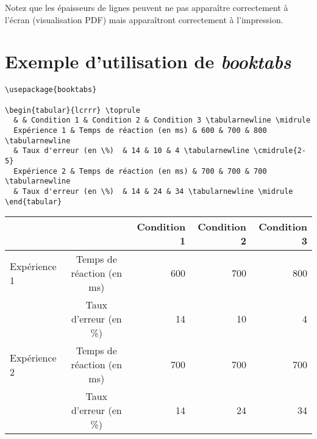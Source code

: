 Notez que les épaisseurs de lignes peuvent ne pas apparaître
correctement à l'écran (visualisation PDF) mais apparaîtront
correctement à l'impression.


\section{Exemple d'utilisation de \emph{booktabs}}

\begin{boxedminipage}{\textwidth}
\begin{verbatim}
\usepackage{booktabs}

\begin{tabular}{lcrrr} \toprule
  & & Condition 1 & Condition 2 & Condition 3 \tabularnewline \midrule
  Expérience 1 & Temps de réaction (en ms) & 600 & 700 & 800 \tabularnewline
  & Taux d'erreur (en \%)  & 14 & 10 & 4 \tabularnewline \cmidrule{2-5}
  Expérience 2 & Temps de réaction (en ms) & 700 & 700 & 700 \tabularnewline
  & Taux d'erreur (en \%)  & 14 & 24 & 34 \tabularnewline \midrule
\end{tabular}
\end{verbatim}
\end{boxedminipage}

\begin{center}
  \begin{tabular}{lcrrr} \toprule
    & & Condition 1 & Condition 2 & Condition 3 \tabularnewline \midrule
    Expérience 1 & Temps de réaction (en ms) & 600 & 700 & 800 \tabularnewline
    & Taux d'erreur (en \%)  & 14 & 10 & 4 \tabularnewline \cmidrule{2-5}
    Expérience 2 & Temps de réaction (en ms) & 700 & 700 & 700 \tabularnewline
    & Taux d'erreur (en \%)  & 14 & 24 & 34 \tabularnewline \midrule
  \end{tabular}
\end{center}


